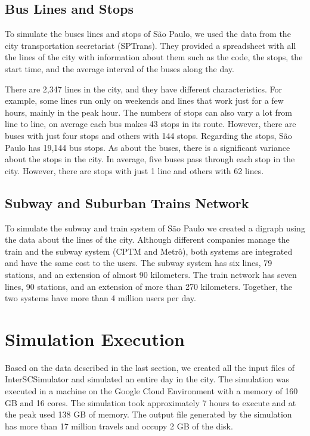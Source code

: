 \subsection{Bus Lines and Stops}

To simulate the buses lines and stops of S\~ao Paulo, we used the data from the city transportation secretariat (SPTrans). They provided a spreadsheet with all the lines of the city with information about them such as the code, the stops, the start time, and the average interval of the buses along the day.

There are 2,347 lines in the city, and they have different characteristics. For example, some lines run only on weekends and lines that work just for a few hours, mainly in the peak hour. The numbers of stops can also vary a lot from line to line, on average each bus makes 43 stops in its route. However, there are buses with just four stops and others with 144 stops. Regarding the stops, S\~ao Paulo has 19,144 bus stops. As about the buses, there is a significant variance about the stops in the city. In average, five buses pass through each stop in the city. However, there are stops with just 1 line and others with 62 lines.

\subsection{Subway and Suburban Trains Network}

To simulate the subway and train system of S\~ao Paulo we created a digraph using the data about the lines of the city. Although different companies manage the train and the subway system (CPTM and Metrô), both systems are integrated and have the same cost to the users. The subway system has six lines, 79 stations, and an extension of almost 90 kilometers. The train network has seven lines, 90 stations, and an extension of more than 270 kilometers. Together, the two systems have more than 4 million users per day. 

\section{Simulation Execution}

Based on the data described in the last section, we created all the input files of InterSCSimulator and simulated an entire day in the city. The simulation was executed in a machine on the Google Cloud Environment with a memory of 160 GB and 16 cores. The simulation took approximately 7 hours to execute and at the peak used 138 GB of memory. The output file generated by the simulation has more than 17 million travels and occupy 2 GB of the disk.

